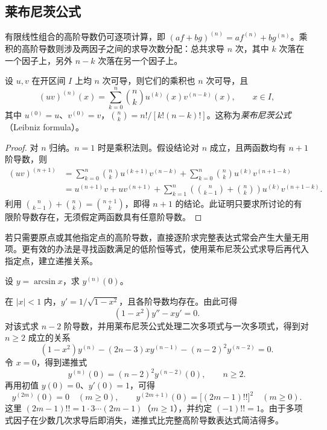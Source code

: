 \documentclass[UTF8,12pt,a4paper,fontset=fandol]{ctexbook}
\begin{document}
\subsection{莱布尼茨公式}
\label{subsec:leibniz-formula}

有限线性组合的高阶导数仍可逐项计算，即 $(af+bg)^{(n)}=af^{(n)}+bg^{(n)}$。乘积的高阶导数则涉及两因子之间的求导次数分配：总共求导 $n$ 次，其中 $k$ 次落在一个因子上，另外 $n-k$ 次落在另一个因子上。

\begin{theorem}[莱布尼茨公式]
\label{thm:leibniz-higher-product-rule}
设 $u,v$ 在开区间 $I$ 上均 $n$ 次可导，则它们的乘积也 $n$ 次可导，且
\begin{equation}
\label{eq:leibniz-higher-product-rule}
    (uv)^{(n)}(x)=\sum_{k=0}^n\binom nk
    u^{(k)}(x)v^{(n-k)}(x),\qquad x\in I,
\end{equation}
其中 $u^{(0)}=u$、$v^{(0)}=v$，$\binom nk=n!/[k!(n-k)!]$。这称为\emph{莱布尼茨公式}（Leibniz formula）。
\end{theorem}
\begin{proof}
对 $n$ 归纳。$n=1$ 时是乘积法则。假设结论对 $n$ 成立，且两函数均有 $n+1$ 阶导数，则
\[
\begin{aligned}
    (uv)^{(n+1)}
    &=\sum_{k=0}^n\binom nk u^{(k+1)}v^{(n-k)}
      +\sum_{k=0}^n\binom nk u^{(k)}v^{(n+1-k)}\\
    &=u^{(n+1)}v+uv^{(n+1)}
      +\sum_{k=1}^n
       \left(\binom n{k-1}+\binom nk\right)
       u^{(k)}v^{(n+1-k)}.
\end{aligned}
\]
利用 $\binom n{k-1}+\binom nk=\binom{n+1}k$，即得 $n+1$ 的结论。此证明只要求所讨论的有限阶导数存在，无须假定两函数具有任意阶导数。
\end{proof}

若只需要原点或其他指定点的高阶导数，直接逐阶求完整表达式常会产生大量无用项。更有效的办法是寻找函数满足的低阶恒等式，使用莱布尼茨公式求导后再代入指定点，建立递推关系。

\begin{example}
\label{ex:arcsine-derivative-recurrence-at-zero}
设 $y=\arcsin x$，求 $y^{(n)}(0)$。
\end{example}
\begin{solve}
在 $|x|<1$ 内，$y'=1/\sqrt{1-x^2}$，且各阶导数均存在。由此可得
\[
    (1-x^2)y''-xy'=0.
\]
对该式求 $n-2$ 阶导数，并用莱布尼茨公式处理二次多项式与一次多项式，得到对 $n\geq2$ 成立的关系
\[
    (1-x^2)y^{(n)}-(2n-3)xy^{(n-1)}
    -(n-2)^2y^{(n-2)}=0.
\]
令 $x=0$，得到递推式
\begin{equation}
\label{eq:arcsine-derivatives-zero-recurrence}
    y^{(n)}(0)=(n-2)^2y^{(n-2)}(0),\qquad n\geq2.
\end{equation}
再用初值 $y(0)=0$、$y'(0)=1$，可得
\[
    y^{(2m)}(0)=0\quad(m\geq0),\qquad
    y^{(2m+1)}(0)=\bigl[(2m-1)!!\bigr]^2\quad(m\geq0).
\]
这里 $(2m-1)!!=1\cdot3\cdots(2m-1)$（$m\geq1$），并约定 $(-1)!!=1$。由于多项式因子在少数几次求导后即消失，递推式比完整高阶导数表达式简洁得多。
\end{solve}
\end{document}
